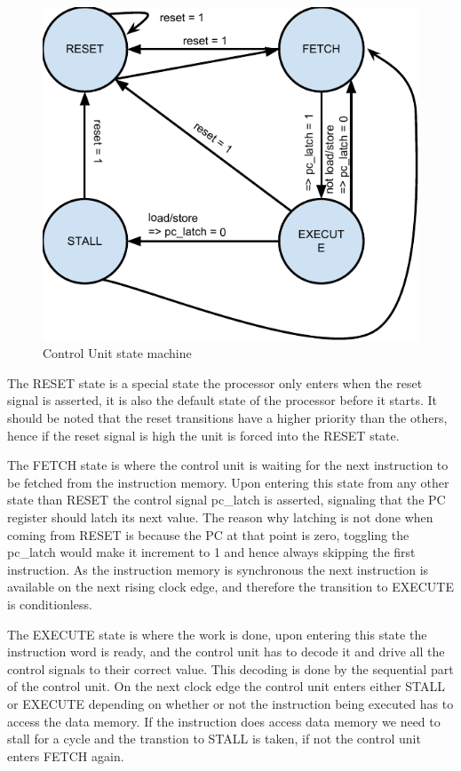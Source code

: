 \begin{figure}[h]
    \centering\includegraphics[scale=0.8]{figures/control_unit_state_machine}
    \caption{Control Unit state machine}
    \label{figure:ctrl_unit_state_machine}    
\end{figure}

The RESET state is a special state the processor only enters when the reset signal is asserted, it is also the default state of the processor before it starts. It should be noted that the reset transitions have a higher priority than the others, hence if the reset signal is high the unit is forced into the RESET state.

The FETCH state is where the control unit is waiting for the next instruction to be fetched from the instruction memory. Upon entering this state from any other state than RESET the control signal pc\_latch is asserted, signaling that the PC register should latch its next value. The reason why latching is not done when coming from RESET is because the PC at that point is zero, toggling the pc\_latch would make it increment to 1 and hence always skipping the first instruction. As the instruction memory is synchronous the next instruction is available on the next rising clock edge, and therefore the transition to EXECUTE is conditionless.

The EXECUTE state is where the work is done, upon entering this state the instruction word is ready, and the control unit has to decode it and drive all the control signals to their correct value. This decoding is done by the sequential part of the control unit. On the next clock edge the control unit enters either STALL or EXECUTE depending on whether or not the instruction being executed has to access the data memory. If the instruction does access data memory we need to stall for a cycle and the transtion to STALL is taken, if not the control unit enters FETCH again.

